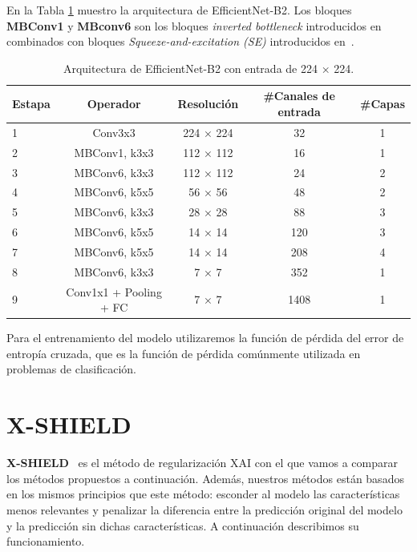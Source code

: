 En la Tabla \ref{tab:EfficientNetB2_arquitectura} muestro la arquitectura de EfficientNet-B2. Los bloques \textbf{MBConv1} y \textbf{MBconv6} son los bloques \textit{inverted bottleneck} introducidos en~\cite{mobilenet} combinados con bloques \textit{Squeeze-and-excitation (SE)} introducidos en~\cite{SE}.

\begin{table}[h!]
\centering
\begin{tabular}{lcccc}
\hline
\textbf{Estapa} & \textbf{Operador} & \textbf{Resolución} & \textbf{\#Canales de entrada} & \textbf{\#Capas} \\
\hline
1 & Conv3x3                & 224 × 224 & 32   & 1 \\
2 & MBConv1, k3x3          & 112 × 112 & 16   & 1 \\
3 & MBConv6, k3x3          & 112 × 112 & 24   & 2 \\
4 & MBConv6, k5x5          & 56 × 56   & 48   & 2 \\
5 & MBConv6, k3x3          & 28 × 28   & 88   & 3 \\
6 & MBConv6, k5x5          & 14 × 14   & 120  & 3 \\
7 & MBConv6, k5x5          & 14 × 14   & 208  & 4 \\
8 & MBConv6, k3x3          & 7 × 7     & 352  & 1 \\
9 & Conv1x1 + Pooling + FC & 7 × 7     & 1408 & 1 \\
\hline
\end{tabular}
\caption{Arquitectura de EfficientNet-B2 con entrada de 224 × 224.}
\label{tab:EfficientNetB2_arquitectura}
\end{table}

Para el entrenamiento del modelo utilizaremos la función de pérdida del error de entropía cruzada, que es la función de pérdida comúnmente utilizada en problemas de clasificación.


\section{X-SHIELD}

\textbf{X-SHIELD}~\cite{XSHIELD} es el método de regularización XAI con el que vamos a comparar los métodos propuestos a continuación. Además, nuestros métodos están basados en los mismos principios que este método: esconder al modelo las características menos relevantes y penalizar la diferencia entre la predicción original del modelo y la predicción sin dichas características. A continuación describimos su funcionamiento.

